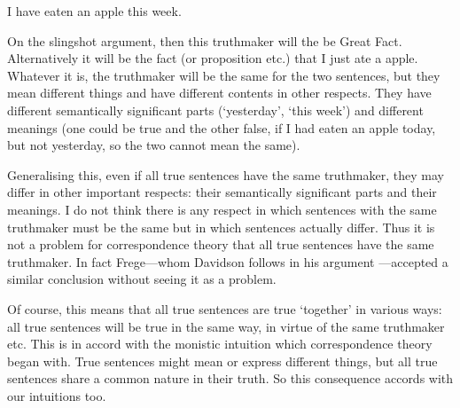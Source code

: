 	\begin{example} \label{week}
	I have eaten an apple this week.
	\end{example}

On the slingshot argument, then this truthmaker will the be Great Fact.
Alternatively it will be the fact (or proposition etc.) that I just ate a apple.
Whatever it is, the truthmaker will be the same for the two sentences, but they mean different things and have different contents in other respects.
They have different semantically significant parts (`yesterday', `this week') and different meanings (one could be true and the other false, if I had eaten an apple today, but not yesterday, so the two cannot mean the same).

Generalising this, even if all true sentences have the same truthmaker, they may differ in other important respects: their semantically significant parts and their meanings.
I do not think there is any respect in which sentences with the same truthmaker must be the same but in which sentences actually differ.
Thus it is not a problem for correspondence theory that all true sentences have the same truthmaker.
In fact Frege---whom Davidson follows in his argument \parencite[750]{Davidson_1969}---accepted a similar conclusion without seeing it as a problem.
\parencite[216]{Frege_1948}

Of course, this means that all true sentences are true `together' in various ways: all true sentences will be true in the same way, in virtue of the same truthmaker etc.
This is in accord with the monistic intuition which correspondence theory began with.
True sentences might mean or express different things, but all true sentences share a common nature in their truth.
So this consequence accords with our intuitions too.
